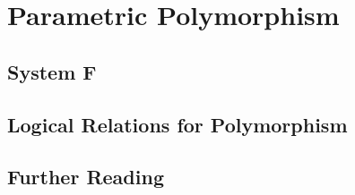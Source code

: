 \chapter{Parametric Polymorphism}

\section{System F}

\section{Logical Relations for Polymorphism}

\section{Further Reading}
